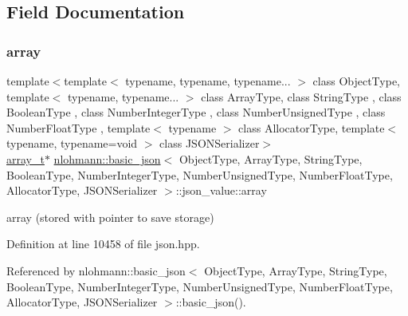 \subsection{Field Documentation}
\mbox{\label{unionnlohmann_1_1basic__json_1_1json__value_a7947687f3ae1911d6e9847e2b3226157}} 
\subsubsection{\texorpdfstring{array}{array}}
{\footnotesize\ttfamily template$<$template$<$ typename, typename, typename... $>$ class Object\+Type, template$<$ typename, typename... $>$ class Array\+Type, class String\+Type , class Boolean\+Type , class Number\+Integer\+Type , class Number\+Unsigned\+Type , class Number\+Float\+Type , template$<$ typename $>$ class Allocator\+Type, template$<$ typename, typename=void $>$ class J\+S\+O\+N\+Serializer$>$ \\
\hyperlink{classnlohmann_1_1basic__json_ae095578e03df97c5b3991787f1056374}{array\+\_\+t}$\ast$ \hyperlink{classnlohmann_1_1basic__json}{nlohmann\+::basic\+\_\+json}$<$ Object\+Type, Array\+Type, String\+Type, Boolean\+Type, Number\+Integer\+Type, Number\+Unsigned\+Type, Number\+Float\+Type, Allocator\+Type, J\+S\+O\+N\+Serializer $>$\+::json\+\_\+value\+::array}



array (stored with pointer to save storage) 



Definition at line 10458 of file json.\+hpp.



Referenced by nlohmann\+::basic\+\_\+json$<$ Object\+Type, Array\+Type, String\+Type, Boolean\+Type, Number\+Integer\+Type, Number\+Unsigned\+Type, Number\+Float\+Type, Allocator\+Type, J\+S\+O\+N\+Serializer $>$\+::basic\+\_\+json().

\mbox{\label{unionnlohmann_1_1basic__json_1_1json__value_afd0f8ec00c40301efffd01a276959371}} 
